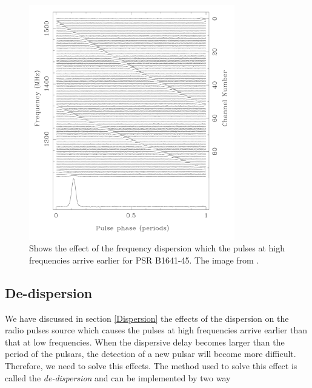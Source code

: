 \begin{figure}[htbp!] 
\centering    
\includegraphics[width=0.8\textwidth]{pulsar_dm.png}
\caption[The frequency dispersion]{Shows the effect of the frequency dispersion which the pulses at high frequencies  arrive earlier for PSR B1641-45. The image from \citet{lyne2012pulsar}.  
}
\label{fig:DM effect}
\end{figure}



\subsection{De-dispersion}
We have discussed in section \cref{Dispersion} the effects of the dispersion on the radio pulses source which causes the pulses at high frequencies arrive earlier than that at low frequencies. When the dispersive delay becomes larger than the period of the pulsars, the detection of a new pulsar will become more difficult. Therefore, we need to solve this effects. The method used to solve this effect is called the \textit{de-dispersion} and can be implemented by two way

